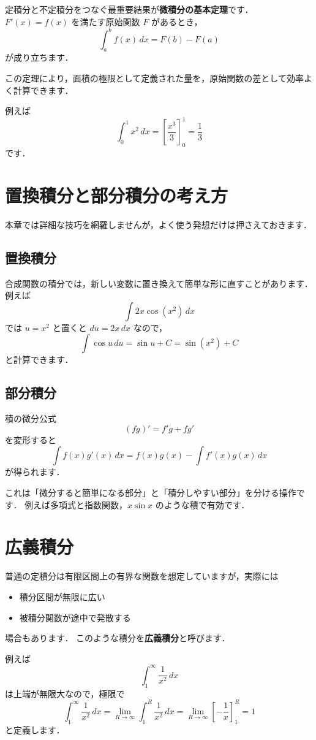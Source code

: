 定積分と不定積分をつなぐ最重要結果が\textbf{微積分の基本定理}です．
$F'(x)=f(x)$ を満たす原始関数 $F$ があるとき，
\[
\int_a^b f(x)\,dx = F(b) - F(a)
\]
が成り立ちます．

この定理により，面積の極限として定義された量を，原始関数の差として効率よく計算できます．

例えば
\[
\int_0^1 x^2\,dx
= \left[\frac{x^3}{3}\right]_0^1
= \frac{1}{3}
\]
です．


\section{置換積分と部分積分の考え方}

本章では詳細な技巧を網羅しませんが，よく使う発想だけは押さえておきます．

\subsection{置換積分}

合成関数の積分では，新しい変数に置き換えて簡単な形に直すことがあります．
例えば
\[
\int 2x \cos(x^2)\,dx
\]
では $u = x^2$ と置くと $du = 2x\,dx$ なので，
\[
\int \cos u\,du = \sin u + C = \sin(x^2) + C
\]
と計算できます．

\subsection{部分積分}

積の微分公式
\[
(fg)' = f'g + fg'
\]
を変形すると
\[
\int f(x)g'(x)\,dx
= f(x)g(x) - \int f'(x)g(x)\,dx
\]
が得られます．

これは「微分すると簡単になる部分」と「積分しやすい部分」を分ける操作です．
例えば多項式と指数関数，$x\sin x$ のような積で有効です．


\section{広義積分}

普通の定積分は有限区間上の有界な関数を想定していますが，実際には
\begin{itemize}
\item 積分区間が無限に広い
\item 被積分関数が途中で発散する
\end{itemize}
場合もあります．
このような積分を\textbf{広義積分}と呼びます．

例えば
\[
\int_1^\infty \frac{1}{x^2}\,dx
\]
は上端が無限大なので，極限で
\[
\int_1^\infty \frac{1}{x^2}\,dx
= \lim_{R\to\infty}\int_1^R \frac{1}{x^2}\,dx
= \lim_{R\to\infty}\left[-\frac{1}{x}\right]_1^R
= 1
\]
と定義します．

